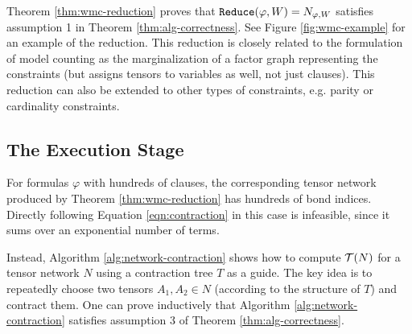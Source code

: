 Theorem \ref{thm:wmc-reduction} proves that $\texttt{\upshape Reduce}(\varphi,W) = N_{\varphi, W}$ satisfies assumption 1 in Theorem \ref{thm:alg-correctness}. See Figure \ref{fig:wmc-example} for an example of the reduction. This reduction is closely related to the formulation of model counting as the marginalization of a factor graph representing the constraints (but assigns tensors to variables as well, not just clauses). %
This reduction can also be extended to other types of constraints, e.g. parity or cardinality constraints.

\subsection{The Execution Stage}
For formulas $\varphi$ with hundreds of clauses, the corresponding tensor network produced by Theorem \ref{thm:wmc-reduction} has hundreds of bond indices. Directly following Equation \ref{eqn:contraction} in this case is infeasible, since it sums over an exponential number of terms. 

Instead, Algorithm \ref{alg:network-contraction} shows how to compute $\mathcal{T}(N)$ for a tensor network $N$ using a contraction tree $T$ as a guide. The key idea is to repeatedly choose two tensors $A_1, A_2 \in N$ (according to the structure of $T$) and contract them. One can prove inductively that Algorithm \ref{alg:network-contraction} satisfies assumption 3 of Theorem \ref{thm:alg-correctness}.


\label{sec:algorithm:execution}

